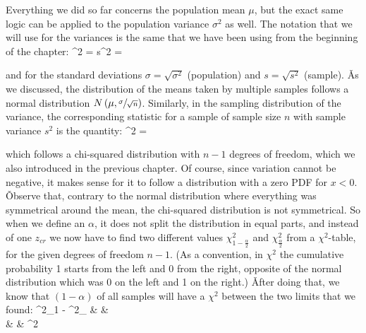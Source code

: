 Everything we did so far concerns the population mean $\mu$, but the exact same logic can be applied to the
population variance $\sigma^{2}$ as well. The notation that we will use for the variances is the same that we have
been using from the beginning of the chapter:
\bse
\sigma^{2} =  \quad {} \qquad \qquad
s^{2} =  \quad {}
\ese

and for the standard deviations $\sigma = \sqrt{\sigma^{2}}$ (population) and $s = \sqrt{s^{2}}$ (sample). \v

As we discussed, the distribution of the means taken by multiple samples follows a normal distribution
$N \left( \mu, \sfrac{\sigma}{\sqrt{n}} \right)$. Similarly, in the sampling distribution of the variance, the
corresponding statistic for a sample of sample size $n$ with sample variance $s^{2}$ is the quantity:
\bse
\chi^{2} = 
\ese

which follows a chi-squared distribution with $n-1$ degrees of freedom, which we also introduced in the previous
chapter. Of course, since variation cannot be negative, it makes sense for it to follow a distribution with a zero
PDF for $x < 0$. \v

Observe that, contrary to the normal distribution where everything was symmetrical around the mean, the chi-squared
distribution is not symmetrical. So when we define an $\alpha$, it does not split the distribution in equal parts,
and instead of one $z_{cr}$ we now have to find two different values $\chi^{2}_{1 - \frac{\alpha}{2}}$ and
$\chi^{2}_{\frac{\alpha}{2}}$ from a $\chi^{2}$-table, for the given degrees of freedom $n - 1$. (As a convention,
in $\chi^{2}$ the cumulative probability 1 starts from the left and 0 from the right, opposite of the normal
distribution which was 0 on the left and 1 on the right.) \v

After doing that, we know that $(1-\alpha)$ of all samples will have a $\chi^{2}$ between the two limits that we
found:
\chi^{2}_{1 - } \: \leq \:  \: \leq \: \chi^{2}_{}
& \eqv &
 \: \geq \:  \: \geq \:
 \\
& \eqv &  \: \leq \: \sigma^{2} \: \leq \:
\ei


